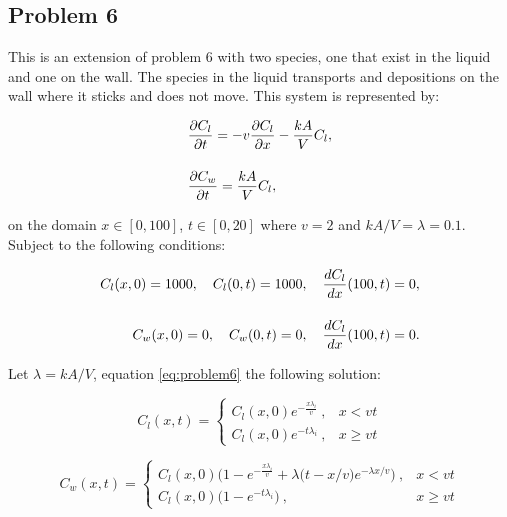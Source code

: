 \clearpage

\subsection{Problem 6}
This is an extension of problem 6 with two species, one that exist in the liquid and one on the wall. The species in the liquid transports and depositions on the wall where it sticks and does not move. This system is represented by:

\begin{equation}
\setlength{\jot}{15pt}
\begin{split}
    &\frac{\partial C_{l}}{\partial t} = -v\frac{\partial C_{l}}{\partial x} - \frac{kA}{V} C_{l}, \\
    &\frac{\partial C_{w}}{\partial t} = \frac{kA}{V} C_{l},
    \label{eq:problem6}
\end{split}
\end{equation}

\noindent on the domain $x \in [0,100]$, $t \in [0, 20]$ where $v = 2$ and $kA/V = \lambda = 0.1$. Subject to the following conditions:

\begin{equation}
\setlength{\jot}{15pt}
\begin{split}
    C_{l}(x, 0) = 1000, \quad C_{l}(0,t) = 1000, \quad \frac{dC_{l}}{dx}(100, t) = 0, \\
    C_{w}(x, 0) = 0, \quad C_{w}(0,t) = 0, \quad \frac{dC_{l}}{dx}(100, t) = 0. \\
\end{split}
\end{equation}

\noindent Let $\lambda = kA/V$, equation \ref{eq:problem6} the following solution:

\begin{equation}
C_{l} (x,t) = \begin{cases}
  C_{l} (x, 0) e^{-\frac{x \lambda _i}{v}}\ , & x < vt \\
  C_{l} (x, 0) e^{-t \lambda _i}\ , & x \ge vt
\end{cases}
\end{equation}

\begin{equation}
C_{w} (x,t) = \begin{cases}
  C_{l} (x, 0) \Big( 1 - e^{-\frac{x \lambda _i}{v}} + \lambda \big(t - x/v\big)e^{-\lambda x/v} \Big)\ , & x < vt \\
  C_{l} (x, 0) \Big( 1 - e^{-t \lambda _i}\Big)\ , & x \ge vt
\end{cases}
\end{equation}

